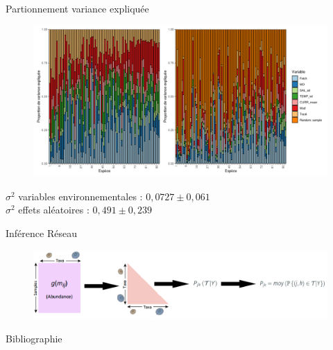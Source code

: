 \documentclass[%
]{beamer}
\begin{document}
	\begin{frame}{Partionnement variance expliquée}
		\begin{figure}[t]
		\begin{center}
			\includegraphics[scale =0.5]{figs/VP_reg_samp.png}%
		\end{center}
	\end{figure}
		$\sigma^2$ variables environnementales : $0,0727\pm 0,061$\\
		$\sigma^2$ effets aléatoires : $0,491\pm 0,239$
	\end{frame}
	
	\begin{frame}{Inférence Réseau}
		\begin{figure}[t]
		\begin{center}
			\includegraphics[scale =0.12]{figs/emtree.png}%
		\end{center}
	\end{figure}
	\end{frame}
	
	\begin{frame}[allowframebreaks]{Bibliographie}
			
	\end{frame}
\end{document}
